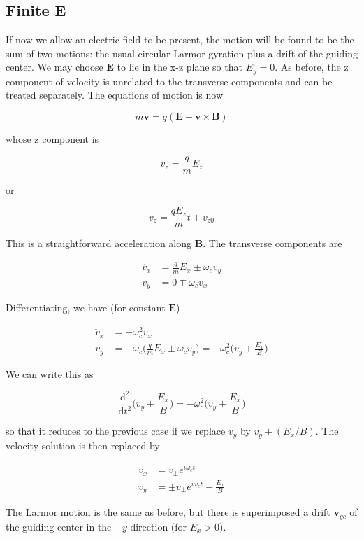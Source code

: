 \documentclass[
  notoc %
]{tufte-book}
\begin{document}
\hypertarget{finite-e}{%
\subsection{Finite E}\label{finite-e}}

If now we allow an electric field to be present, the motion will be
found to be the sum of two motions: the usual circular Larmor gyration
plus a drift of the guiding center. We may choose \(\mathbf{E}\) to lie
in the x-z plane so that \(E_y = 0\). As before, the z component of
velocity is unrelated to the transverse components and can be treated
separately. The equations of motion is now

\[
m\dot{\mathbf{v}} = q( \mathbf{E} + \mathbf{v}\times\mathbf{B} )
\]

whose z component is

\[
\dot{v_z} = \frac{q}{m}E_z
\]

or

\[
v_z = \frac{qE_z}{m}t + v_{z0}
\]

This is a straightforward acceleration along \(\mathbf{B}\). The
transverse components are

\[
\begin{aligned}
\dot{v_x} &= \frac{q}{m}E_x \pm \omega_c v_y \\
\dot{v_y} &= 0 \mp \omega_c v_x
\end{aligned}
\]

Differentiating, we have (for constant \(\mathbf{E}\))

\[
\begin{aligned}
\ddot{v}_x &= -\omega_c^2 v_x \\
\ddot{v}_y &= \mp \omega_c \Big( \frac{q}{m}E_x \pm \omega_c v_y \Big) = -\omega_c^2 \Big( v_y + \frac{E_x}{B} \Big)
\end{aligned}
\]

We can write this as

\[
\frac{\mathrm{d}^2}{\mathrm{d}t^2}\Big( v_y + \frac{E_x}{B} \Big) = -\omega_c^2\Big( v_y + \frac{E_x}{B} \Big)
\]

so that it reduces to the previous case if we replace \(v_y\) by
\(v_y + (E_x/B)\). The velocity solution is then replaced by

\[
\begin{aligned}
v_x &= v_\perp e^{i\omega_c t} \\
v_y &= \pm v_\perp e^{i\omega_c t} - \frac{E_x}{B}
\end{aligned}
\]

The Larmor motion is the same as before, but there is superimposed a
drift \(\mathbf{v}_{gc}\) of the guiding center in the \(-y\) direction
(for \(E_x > 0\)).
\end{document}
